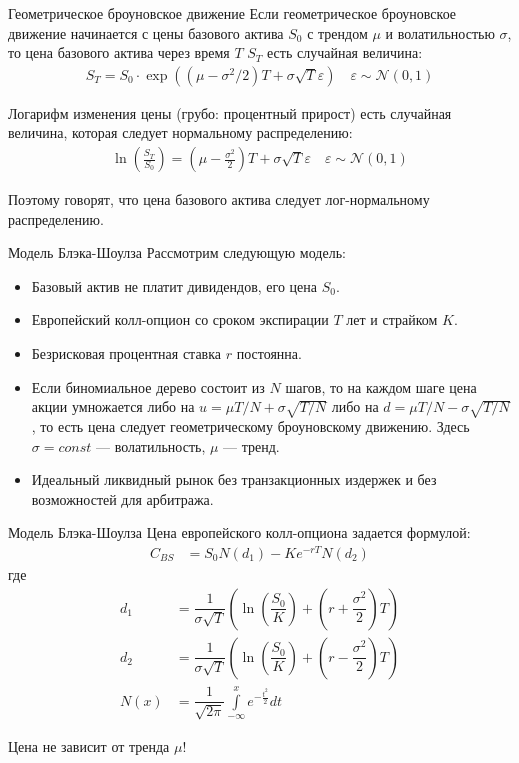 \documentclass{beamer}
\begin{document}
\begin{frame}{Геометрическое броуновское движение}
\justify
Если геометрическое броуновское движение начинается с цены базового актива $S_0$ с трендом $\mu$ и волатильностью $\sigma$, то цена базового актива через время $T$ $S_T$ есть случайная величина:
\begin{align*}
S_T = S_0\cdot \exp\left((\mu - \sigma^2/2)T + \sigma\sqrt{T}\varepsilon\right) \quad \varepsilon \sim \mathcal{N}(0, 1)
\end{align*} 

\justify
Логарифм изменения цены (грубо: процентный прирост) есть случайная величина, которая следует нормальному распределению:
\begin{align*}
\ln\left(\frac{S_T}{S_0}\right) = \left(\mu - \frac{\sigma^2}{2}\right)T + \sigma\sqrt{T}\varepsilon \quad \varepsilon \sim \mathcal{N}(0, 1)
\end{align*}

\justify
Поэтому говорят, что цена базового актива следует лог-нормальному распределению.
\end{frame}



\begin{frame}{Модель Блэка-Шоулза}
\justify
Рассмотрим следующую модель:
\begin{itemize}
\item Базовый актив не платит дивидендов, его цена $S_0$.
\item Европейский колл-опцион со сроком экспирации $T$ лет и страйком $K$.
\item Безрисковая процентная ставка $r$ постоянна.
\item Если биномиальное дерево состоит из $N$ шагов, то на каждом шаге цена акции умножается либо на $u = \mu T/N + \sigma\sqrt{T/N}$ либо на $d=\mu T/N - \sigma\sqrt{T/N}$, то есть цена следует геометрическому броуновскому движению. Здесь $\sigma=const$ --- волатильность, $\mu$ --- тренд.
\item Идеальный ликвидный рынок без транзакционных издержек и без возможностей для арбитража.
\end{itemize}
\end{frame}



\begin{frame}{Модель Блэка-Шоулза}
Цена европейского колл-опциона задается формулой:
\begin{align*}
C_{BS} &= S_0N(d_1) - Ke^{-rT}N(d_2)
\end{align*}
где
\begin{align*}
d_1 &= \dfrac{1}{\sigma\sqrt{T}}\left( \ln\left(\dfrac{S_0}{K}\right) + \left(r + \dfrac{\sigma^2}{2}\right)T\right) \\
d_2 &= \dfrac{1}{\sigma\sqrt{T}}\left( \ln\left(\dfrac{S_0}{K}\right) + \left(r - \dfrac{\sigma^2}{2}\right)T\right) \\
N(x) &= \dfrac{1}{\sqrt{2\pi}}\int\limits_{-\infty}^x e^{-\frac{t^2}{2}}dt
\end{align*}

\justify
Цена не зависит от тренда $\mu$!
\end{frame}
\end{document}
